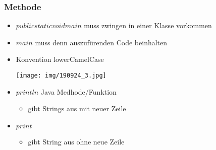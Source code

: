 \documentclass[11pt]{article}
\begin{document}
\subsubsection{Methode}
\label{sec:orgbb155a6}
\begin{itemize}
\item \(public static void main\) muss zwingen in einer Klasse vorkommen\\
\item \(main\) muss denn auszufürenden Code beinhalten\\
\item Konvention lowerCamelCase\\
\begin{center}
\texttt{[image: img/190924\_3.jpg]}
\end{center}
\item \(println\) Java Medhode/Funktion\\
\begin{itemize}
\item gibt Strings aus mit neuer Zeile\\
\end{itemize}
\item \(print\)\\
\begin{itemize}
\item gibt String aus ohne neue Zeile\\
\end{itemize}
\end{itemize}
\end{document}
